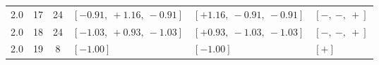 \begin{landscape}
\begin{longtable}{@{}ccc >{\raggedright\arraybackslash}p{6.1cm} >{\raggedright\arraybackslash}p{6.1cm} >{\raggedright\arraybackslash}p{4.2cm}@{}}
2.0 & 17 & 24 & \([-0.91,\allowbreak\ +1.16,\allowbreak\ -0.91]\) & \([+1.16,\allowbreak\ -0.91,\allowbreak\ -0.91]\) & \([-,\allowbreak\ -,\allowbreak\ +]\) \\
2.0 & 18 & 24 & \([-1.03,\allowbreak\ +0.93,\allowbreak\ -1.03]\) & \([+0.93,\allowbreak\ -1.03,\allowbreak\ -1.03]\) & \([-,\allowbreak\ -,\allowbreak\ +]\) \\
2.0 & 19 & 8 & \([-1.00]\) & \([-1.00]\) & \([+]\) \\
\end{longtable}
\end{landscape}
